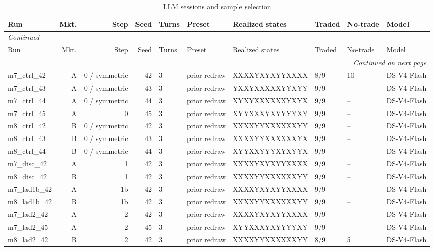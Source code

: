 \tiny
\begin{longtable}{p{2.6cm}rrrp{.8cm}p{1.6cm}p{3.0cm}p{1.0cm}p{1.0cm}p{2.0cm}}
\caption{LLM sessions and sample selection}\label{tab:app-run-list}\\
\toprule
Run & Mkt. & Step & Seed & Turns & Preset & Realized states & Traded & No-trade & Model \\
\midrule
\endfirsthead
\multicolumn{10}{l}{\textit{Continued}}\\
\toprule
Run & Mkt. & Step & Seed & Turns & Preset & Realized states & Traded & No-trade & Model \\
\midrule
\endhead
\midrule
\multicolumn{10}{r}{\textit{Continued on next page}}\\
\endfoot
\bottomrule
\endlastfoot
m7\_ctrl\_42 & A & 0 / symmetric & 42 & 3 & prior redraw & XXXXYXYXYYXXXX & 8/9 & 10 & DS-V4-Flash \\
m7\_ctrl\_43 & A & 0 / symmetric & 43 & 3 & prior redraw & YXXYXXXXXYYXYY & 9/9 & -- & DS-V4-Flash \\
m7\_ctrl\_44 & A & 0 / symmetric & 44 & 3 & prior redraw & XYXYXXXXXXYXYX & 9/9 & -- & DS-V4-Flash \\
m7\_ctrl\_45 & A & 0 & 45 & 3 & prior redraw & XYYXXXYXYYYYXY & 9/9 & -- & DS-V4-Flash \\
m8\_ctrl\_42 & B & 0 / symmetric & 42 & 3 & prior redraw & XXXXYYXXXXXXYY & 9/9 & -- & DS-V4-Flash \\
m8\_ctrl\_43 & B & 0 / symmetric & 43 & 3 & prior redraw & XXXXYYXXXXXXYX & 9/9 & -- & DS-V4-Flash \\
m8\_ctrl\_44 & B & 0 / symmetric & 44 & 3 & prior redraw & XYYXXYYYXYXYYX & 9/9 & -- & DS-V4-Flash \\
m7\_disc\_42 & A & 1 & 42 & 3 & prior redraw & XXXXYXYXYYXXXX & 9/9 & -- & DS-V4-Flash \\
m8\_disc\_42 & B & 1 & 42 & 3 & prior redraw & XXXXYYXXXXXXYY & 9/9 & -- & DS-V4-Flash \\
m7\_lad1b\_42 & A & 1b & 42 & 3 & prior redraw & XXXXYXYXYYXXXX & 9/9 & -- & DS-V4-Flash \\
m8\_lad1b\_42 & B & 1b & 42 & 3 & prior redraw & XXXXYYXXXXXXYY & 9/9 & -- & DS-V4-Flash \\
m7\_lad2\_42 & A & 2 & 42 & 3 & prior redraw & XXXXYXYXYYXXXX & 9/9 & -- & DS-V4-Flash \\
m7\_lad2\_45 & A & 2 & 45 & 3 & prior redraw & XYYXXXYXYYYYXY & 9/9 & -- & DS-V4-Flash \\
m8\_lad2\_42 & B & 2 & 42 & 3 & prior redraw & XXXXYYXXXXXXYY & 8/9 & 5 & DS-V4-Flash \\

\end{longtable}
